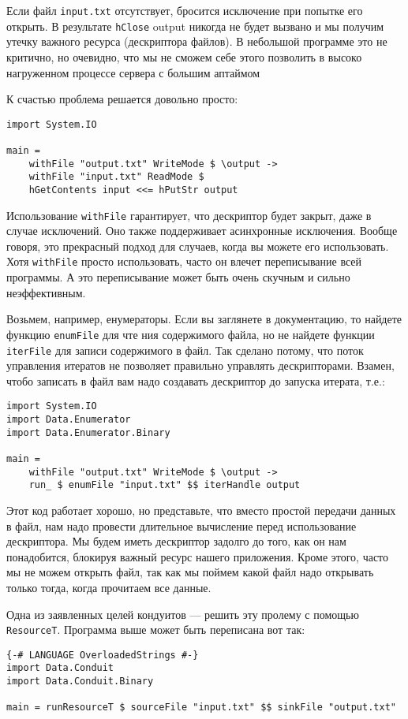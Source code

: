Если файл \verb*|input.txt| отсутствует, бросится исключение при попытке его открыть. В
результате \lstinline'hClose' output никогда не будет вызвано и мы получим утечку важного
ресурса
(дескриптора файлов). В небольшой программе это не критично, но очевидно, что мы не
сможем себе этого позволить в высоко нагруженном процессе сервера с большим аптаймом

К счастью проблема решается довольно просто:
\begin{lstlisting}
import System.IO

main =
    withFile "output.txt" WriteMode $ \output ->
    withFile "input.txt" ReadMode $ 
    hGetContents input <<= hPutStr output
\end{lstlisting}

Использование \lstinline'withFile' гарантирует, что дескриптор будет закрыт, даже в
случае
исключений. Оно также поддерживает асинхронные исключения. Вообще говоря, это прекрасный
подход для случаев, когда вы можете его использовать. Хотя \lstinline'withFile' просто
использовать,
часто он влечет переписывание всей программы. А это переписывание может быть очень
скучным и сильно неэффективным.

Возьмем, например, енумераторы. Если вы заглянете в документацию, то найдете функцию
\lstinline'enumFile' для чте ния содержимого файла, но не найдете функции
\lstinline'iterFile' для записи
содержимого в файл. Так сделано потому, что поток управления итератов не позволяет
правильно управлять дескрипторами. Взамен, чтобо записать в файл вам надо создавать
дескриптор до запуска итерата, т.е.: 

\begin{lstlisting}
import System.IO
import Data.Enumerator
import Data.Enumerator.Binary

main =
    withFile "output.txt" WriteMode $ \output ->
    run_ $ enumFile "input.txt" $$ iterHandle output
\end{lstlisting}

Этот код работает хорошо, но представьте, что вместо простой передачи данных в файл, нам
надо провести длительное вычисление перед использование дескриптора. Мы будем иметь
дескриптор задолго до того, как он нам понадобится, блокируя важный ресурс нашего
приложения. Кроме этого, часто мы не можем открыть файл, так как мы поймем какой файл
надо открывать только тогда, когда прочитаем все данные.

Одна из заявленных целей кондуитов --- решить эту пролему с помощью \lstinline'ResourceT'.
Программа
выше может быть переписана вот так:
\begin{lstlisting}
{-# LANGUAGE OverloadedStrings #-}
import Data.Conduit
import Data.Conduit.Binary

main = runResourceT $ sourceFile "input.txt" $$ sinkFile "output.txt"
\end{lstlisting}

